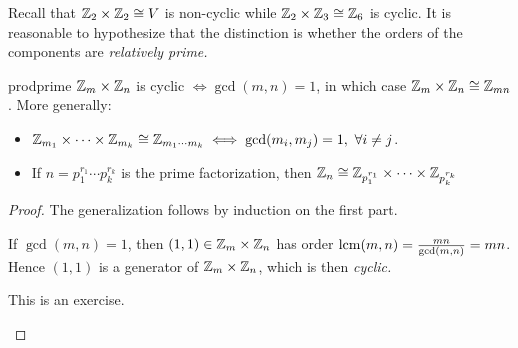 Recall that $\mathbb{Z}_2\times\mathbb{Z}_2\cong V$ is non-cyclic while $\mathbb{Z}_2\times\mathbb{Z}_3\cong \mathbb{Z}_6$ is cyclic. It is reasonable to hypothesize that the distinction is whether the orders of the components are \emph{relatively prime.} 

\begin{cor}{}{prodprime}
$\mathbb{Z}_m\times\mathbb{Z}_n$ is cyclic $\iff \gcd(m,n)=1$, in which case $\mathbb{Z}_m\times\mathbb{Z}_n\cong\mathbb{Z}_{mn}$.\smallbreak
More generally:
\begin{itemize}\itemsep0pt
  \item $\mathbb{Z}_{m_1}\times\cdots\times\mathbb{Z}_{m_k}\cong\mathbb{Z}_{m_1\cdots m_k}\iff \gcd(m_i,m_j)=1,\ \forall i\neq j$.
  \item If $n=p_1^{r_1}\cdots p_k^{r_k}$ is the prime factorization, then
$\mathbb{Z}_n\cong\mathbb{Z}_{p_1^{r_1}}\times\cdots\times\mathbb{Z}_{p_k^{r_k}}$
\end{itemize} 
\end{cor}

\begin{proof}
The generalization follows by induction on the first part.
\begin{description}\itemsep0pt
\item[\normalfont ($\Leftarrow$)] If $\gcd(m,n)=1$, then $(1,1)\in\mathbb{Z}_m\times\mathbb{Z}_n$ has order $\operatorname{lcm}(m,n)=\frac{mn}{\gcd(m,n)} =mn$. Hence $(1,1)$ is a generator of $\mathbb{Z}_m\times\mathbb{Z}_n$, which is then \emph{cyclic.}
\item[\normalfont ($\Rightarrow$)] This is an exercise.\qedhere
\end{description}
\end{proof}


